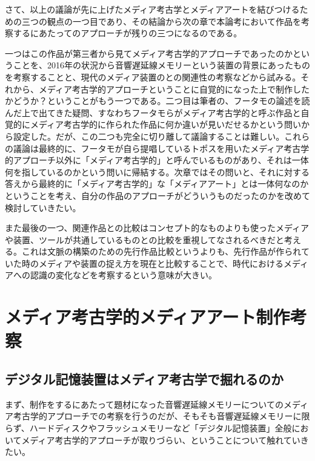 \documentclass[a4paper,report]{jsbook}
\begin{document}
さて、以上の議論が先に上げたメディア考古学とメディアアートを結びつけるための三つの観点の一つ目であり、その結論から次の章で本論考において作品を考察するにあたってのアプローチが残りの三つになるのである。

一つはこの作品が第三者から見てメディア考古学的アプローチであったのかということを、2016年の状況から音響遅延線メモリーという装置の背景にあったものを考察することと、現代のメディア装置のとの関連性の考察などから試みる。それから、メディア考古学的アプローチということに自覚的になった上で制作したかどうか？ということがもう一つである。二つ目は筆者の、フータモの論述を読んだ上で出てきた疑問、すなわちフータモらがメディア考古学的と呼ぶ作品と自覚的にメディア考古学的に作られた作品に何か違いが見いだせるかという問いから設定した。だが、この二つも完全に切り離して議論することは難しい。これらの議論は最終的に、フータモが自ら提唱しているトポスを用いたメディア考古学的アプローチ以外に「メディア考古学的」と呼んでいるものがあり、それは一体何を指しているのかという問いに帰結する。次章ではその問いと、それに対する答えから最終的に「メディア考古学的」な「メディアアート」とは一体何なのかということを考え、自分の作品のアプローチがどういうものだったのかを改めて検討していきたい。

また最後の一つ、関連作品との比較はコンセプト的なものよりも使ったメディアや装置、ツールが共通しているものとの比較を重視してなされるべきだと考える。これは文脈の構築のための先行作品比較というよりも、先行作品が作られていた時のメディアや装置の捉え方を現在と比較することで、時代におけるメディアへの認識の変化などを考察するという意味が大きい。

\chapter{メディア考古学的メディアアート制作考察}\label{ux30e1ux30c7ux30a3ux30a2ux8003ux53e4ux5b66ux7684ux30e1ux30c7ux30a3ux30a2ux30a2ux30fcux30c8ux5236ux4f5cux8003ux5bdf}

\section{デジタル記憶装置はメディア考古学で掘れるのか}\label{ux30c7ux30b8ux30bfux30ebux8a18ux61b6ux88c5ux7f6eux306fux30e1ux30c7ux30a3ux30a2ux8003ux53e4ux5b66ux3067ux6398ux308cux308bux306eux304b}

まず、制作をするにあたって題材になった音響遅延線メモリーについてのメディア考古学的アプローチでの考察を行うのだが、そもそも音響遅延線メモリーに限らず、ハードディスクやフラッシュメモリーなど「デジタル記憶装置」全般においてメディア考古学的アプローチが取りづらい、ということについて触れていきたい。
\end{document}
